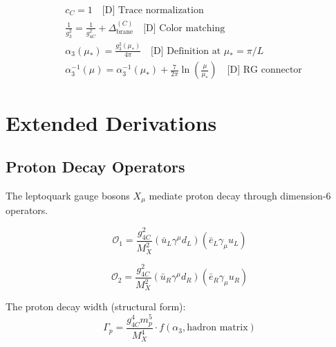 \documentclass[11pt,a4paper]{article}
\theoremstyle{definition}
\begin{document}
\begin{predictionbox}
\begin{align}
  \label{eq:final-cc}
  & \boxed{c_C = 1} \quad \text{[D] Trace normalization} \\[1em]
  \label{eq:final-matching}
  & \boxed{\frac{1}{g_3^2} = \frac{1}{g_{4C}^2} + \Delta_{\text{brane}}^{(C)}} \quad \text{[D] Color matching} \\[1em]
  \label{eq:final-alpha3}
  & \boxed{\alpha_3(\mu_*) = \frac{g_3^2(\mu_*)}{4\pi}} \quad \text{[D] Definition at } \mu_* = \pi/L \\[1em]
  \label{eq:final-rg}
  & \boxed{\alpha_3^{-1}(\mu) = \alpha_3^{-1}(\mu_*) + \frac{7}{2\pi}\ln\left(\frac{\mu}{\mu_*}\right)} \quad \text{[D] RG connector}
\end{align}
\end{predictionbox}

\newpage

\section{Extended Derivations}
\label{sec:extended}

\subsection{Proton Decay Operators}
\label{subsec:proton-decay}

The leptoquark gauge bosons $X_{\mu}$ mediate proton decay through dimension-6 operators.

\begin{equation}
  \label{eq:proton-op-1}
  \mathcal{O}_1 = \frac{g_{4C}^2}{M_X^2} (\bar{u}_L \gamma^{\mu} d_L)(\bar{e}_L \gamma_{\mu} u_L)
\end{equation}

\begin{equation}
  \label{eq:proton-op-2}
  \mathcal{O}_2 = \frac{g_{4C}^2}{M_X^2} (\bar{u}_R \gamma^{\mu} d_R)(\bar{e}_R \gamma_{\mu} u_R)
\end{equation}

The proton decay width (structural form):
\begin{equation}
  \label{eq:proton-width}
  \Gamma_p = \frac{g_{4C}^4 m_p^5}{M_X^4} \cdot f(\alpha_3, \text{hadron matrix})
\end{equation}
\end{document}
